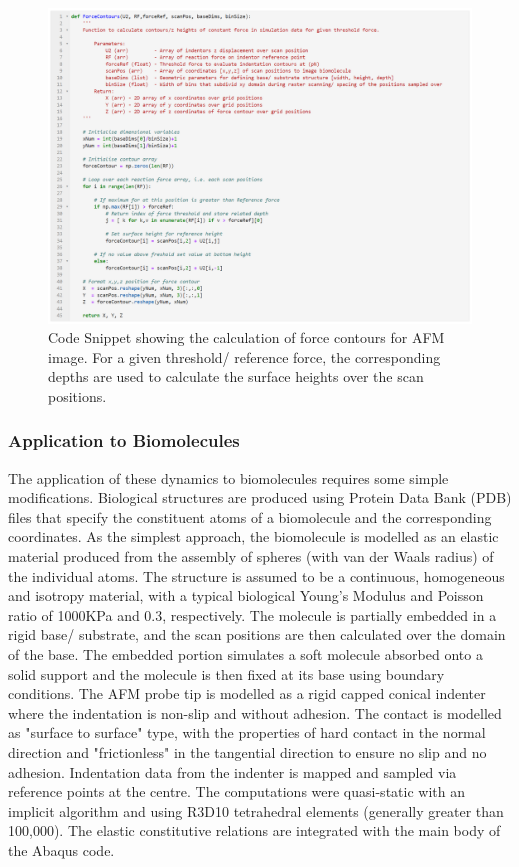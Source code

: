 \begin{figure}[H]
\centering
    \includegraphics[width=1\linewidth]{Figures/ForceContours.png}
    \caption{\label{fig: FourceContours}Code Snippet showing the calculation of force contours for AFM image. For a given threshold/ reference force, the corresponding depths are used to calculate the surface heights over the scan positions.}
\end{figure}


\subsubsection{Application to Biomolecules \label{Chapter 2: ABAQUS Simulation of AFM Biomolecules}}

The application of these dynamics to biomolecules requires some simple modifications. Biological structures are produced using Protein Data Bank (PDB) files that specify the constituent atoms of a biomolecule and the corresponding coordinates. As the simplest approach, the biomolecule is modelled as an elastic material produced from the assembly of spheres (with van der Waals radius) of the individual atoms. The structure is assumed to be a continuous, homogeneous and isotropy material, with a typical biological Young's Modulus and Poisson ratio of 1000KPa and 0.3, respectively. The molecule is partially embedded in a rigid base/ substrate, and the scan positions are then calculated over the domain of the base. The embedded portion simulates a soft molecule absorbed onto a solid support and the molecule is then fixed at its base using boundary conditions. The AFM probe tip is modelled as a rigid capped conical indenter where the indentation is non-slip and without adhesion. The contact is modelled as "surface to surface" type, with the properties of hard contact in the normal direction and "frictionless" in the tangential direction to ensure no slip and no adhesion. Indentation data from the indenter is mapped and sampled via reference points at the centre. The computations were quasi-static with an implicit algorithm and using R3D10 tetrahedral elements (generally greater than 100,000). The elastic constitutive relations are integrated with the main body of the Abaqus code. 

